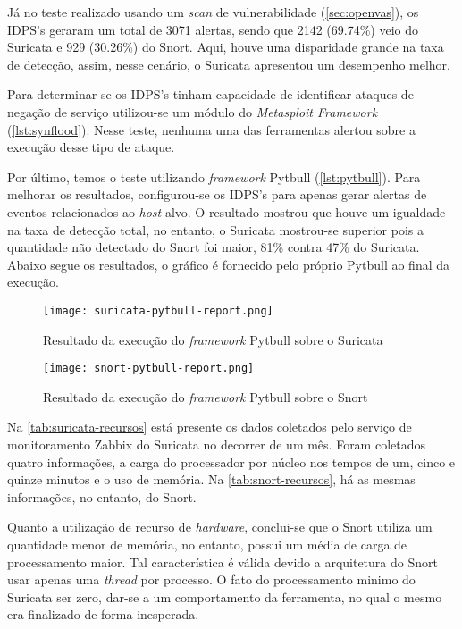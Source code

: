 Já no teste realizado usando um \textit{scan} de vulnerabilidade (\autoref{sec:openvas}), os IDPS's geraram um total de 3071 alertas, sendo que 2142 (69.74\%) veio do Suricata e 929 (30.26\%) do Snort. Aqui, houve uma disparidade grande na taxa de detecção, assim, nesse cenário, o Suricata apresentou um desempenho melhor.

Para determinar se os IDPS's tinham capacidade de identificar ataques de negação de serviço utilizou-se um módulo do \textit{Metasploit Framework} (\autoref{lst:synflood}). Nesse teste, nenhuma uma das ferramentas alertou sobre a execução desse tipo de ataque. 

Por último, temos o teste utilizando \textit{framework} Pytbull (\autoref{lst:pytbull}). Para melhorar os resultados, configurou-se os IDPS's para apenas gerar alertas de eventos relacionados ao \textit{host} alvo. O resultado mostrou que houve um igualdade na taxa de detecção total, no entanto, o Suricata mostrou-se superior pois a quantidade não detectado do Snort foi maior, 81\% contra 47\% do Suricata. Abaixo segue os resultados, o gráfico é fornecido pelo próprio Pytbull ao final da execução. 

\begin{figure}[!htb]
\centering
\caption{Resultado da execução do \textit{framework} Pytbull sobre o Suricata}
\texttt{[image: suricata-pytbull-report.png]}
\label{fig:suricata-pytbull-report}
\end{figure}

\begin{figure}[!htb]
\centering
\caption{Resultado da execução do \textit{framework} Pytbull sobre o Snort}
\texttt{[image: snort-pytbull-report.png]}
\label{fig:snort-pytbull-report}
\end{figure}

Na \autoref{tab:suricata-recursos} está presente os dados coletados pelo serviço de monitoramento Zabbix do Suricata no decorrer de um mês. Foram coletados quatro informações, a carga do processador por núcleo nos tempos de um, cinco e quinze minutos e o uso de memória. Na \autoref{tab:snort-recursos}, há as mesmas informações, no entanto, do Snort.

Quanto a utilização de recurso de \textit{hardware}, conclui-se que o Snort utiliza um quantidade menor de memória, no entanto, possui um média de carga de processamento maior. Tal característica é válida devido a arquitetura do Snort usar apenas uma \textit{thread} por processo. O fato do processamento minimo do Suricata ser zero, dar-se a um comportamento da ferramenta, no qual o mesmo era finalizado de forma inesperada.  

